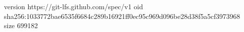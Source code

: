 version https://git-lfs.github.com/spec/v1
oid sha256:1033772bae6535f6684c289b16921ff0ec95c969d096be28d38f5a5cf3973968
size 699182
